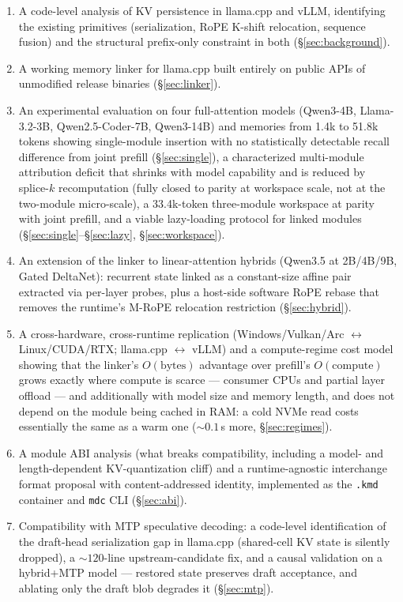 \documentclass[11pt]{article}
\newcommand{\kmd}{\texttt{.kmd}}
\newcommand{\mdc}{\texttt{mdc}}
\begin{document}
\begin{enumerate}
  \item A code-level analysis of KV persistence in llama.cpp and vLLM, identifying the existing primitives (serialization, RoPE K-shift relocation, sequence fusion) and the structural prefix-only constraint in both (\S\ref{sec:background}).
  \item A working memory linker for llama.cpp built entirely on public APIs of unmodified release binaries (\S\ref{sec:linker}).
  \item An experimental evaluation on four full-attention models (Qwen3-4B, Llama-3.2-3B, Qwen2.5-Coder-7B, Qwen3-14B) and memories from 1.4k to 51.8k tokens showing single-module insertion with no statistically detectable recall difference from joint prefill (\S\ref{sec:single}), a characterized multi-module attribution deficit that shrinks with model capability and is reduced by splice-$k$ recomputation (fully closed to parity at workspace scale, not at the two-module micro-scale), a 33.4k-token three-module workspace at parity with joint prefill, and a viable lazy-loading protocol for linked modules (\S\ref{sec:single}--\S\ref{sec:lazy}, \S\ref{sec:workspace}).
  \item An extension of the linker to linear-attention hybrids (Qwen3.5 at 2B/4B/9B, Gated DeltaNet): recurrent state linked as a constant-size affine pair extracted via per-layer probes, plus a host-side software RoPE rebase that removes the runtime's M-RoPE relocation restriction (\S\ref{sec:hybrid}).
  \item A cross-hardware, cross-runtime replication (Windows/Vulkan/Arc $\leftrightarrow$ Linux/CUDA/RTX; llama.cpp $\leftrightarrow$ vLLM) and a compute-regime cost model showing that the linker's $O(\text{bytes})$ advantage over prefill's $O(\text{compute})$ grows exactly where compute is scarce --- consumer CPUs and partial layer offload --- and additionally with model size and memory length, and does not depend on the module being cached in RAM: a cold NVMe read costs essentially the same as a warm one (${\sim}0.1$\,s more, \S\ref{sec:regimes}).
  \item A module ABI analysis (what breaks compatibility, including a model- and length-dependent KV-quantization cliff) and a runtime-agnostic interchange format proposal with content-addressed identity, implemented as the \kmd{} container and \mdc{} CLI (\S\ref{sec:abi}).
  \item Compatibility with MTP speculative decoding: a code-level identification of the draft-head serialization gap in llama.cpp (shared-cell KV state is silently dropped), a ${\sim}120$-line upstream-candidate fix, and a causal validation on a hybrid+MTP model --- restored state preserves draft acceptance, and ablating only the draft blob degrades it (\S\ref{sec:mtp}).

\end{enumerate}
\end{document}
